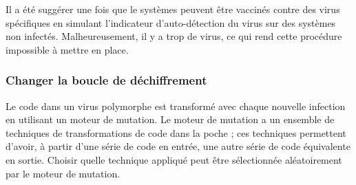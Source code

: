         Il a été suggérer une fois que le systèmes peuvent être vaccinés contre des virus spécifiques en simulant
        l'indicateur d'auto-détection du virus sur des systèmes non infectés. 
        Malheureusement, il y a trop de virus, ce qui rend cette procédure impossible à mettre en place.

        \subsubsection{Changer la boucle de déchiffrement}
        Le code dans un virus polymorphe est transformé avec chaque nouvelle infection en utilisant un moteur de
        mutation. Le moteur de mutation a un ensemble de techniques de transformations de code dans la poche ; 
        ces techniques permettent d'avoir, à partir d'une série de code en entrée, une autre série de code 
        équivalente en sortie. Choisir quelle technique appliqué peut être sélectionnée aléatoirement 
        par le moteur de mutation. 


